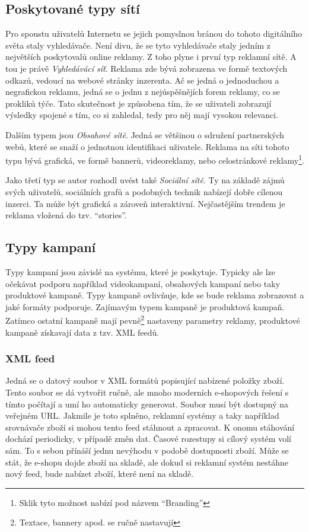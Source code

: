 \subsection{Poskytované typy sítí}
Pro spoustu uživatelů Internetu se jejich pomyslnou bránou do tohoto digitálního světa staly vyhledávače. Není divu, že se tyto vyhledávače staly jedním z největších
poskytovalů online reklamy. Z toho plyne i první typ reklamní sítě. A tou je právě \emph{Vyhledávácí síť}. Reklama zde bývá zobrazena ve formě textových odkazů,
vedoucí na webové stránky inzerenta. Ač se jedná o jednoduchou a negrafickou reklamu, jedná se o jednu z nejúspěšnějích forem reklamy, co se prokliků týče. Tato skutečnost
je způsobena tím, že se uživateli zobrazují výsledky spojené s tím, co si zahledal, tedy pro něj mají vysokou relevanci.

Dalším typem jsou \emph{Obsahové sítě}. Jedná se většinou o sdružení partnerských webů, které se snaží o jednotnou identifikaci uživatele. Reklama na síti tohoto typu bývá
grafická, ve formě bannerů, videoreklamy, nebo celostránkové reklamy\footnote{Sklik tyto možnost nabízí pod názvem \enquote{Branding}}.

Jako třetí typ se autor rozhodl uvést také \emph{Sociální sítě}. Ty na základě zájmů svých uživatelů, sociálních grafů a podobných technik nabízejí dobře cílenou inzerci.
Ta může být grafická a zároveň interaktivní. Nejčastějším trendem je reklama vložená do tzv. \enquote{stories}.

\subsection{Typy kampaní}
Typy kampaní jsou závislé na systému, které je poskytuje. Typicky ale lze očekávat podporu například videokampaní, obsahových kampaní nebo taky produktové kampaně.
Typy kampaně ovlivňuje, kde se bude reklama zobrazovat a jaké formáty podporuje. Zajímavým typem kampaně je produktová kampaň. Zatímco ostatní kampaně mají
pevně\footnote{Textace, bannery apod. se ručně nastavují} nastaveny parametry reklamy, produktové kampaně získavají data z tzv. XML feedů. 

\subsubsection{XML feed}
Jedná se o datový soubor v XML formátů popisující nabízené položky zboží. Tento soubor se dá vytvořit ručně, ale mnoho moderních e-shopových řešení
s tímto počítají a umí ho automaticky generovat. Soubor musí být dostupný na veřejném URL. Jakmile je toto splněno, reklamní systémy a taky například
srovnávače zboží si mohou tento feed stáhnout a zpracovat. K onomu stáhování dochází periodicky, v případě změn dat. Časové rozestupy si cílový systém
volí sám. To s sebou přínáší jednu nevýhodu v podobě dostupnosti zboží. Může se stát, že e-shopu dojde zboží na skladě, ale dokud si reklamní systém
nestáhne nový feed, bude nabízet zboží, které není na skladě.

